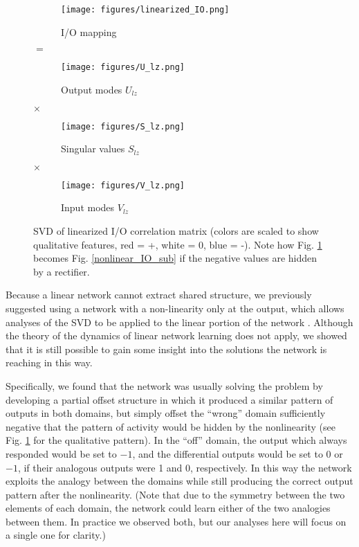 \documentclass[11pt]{article}
\begin{document}
\begin{figure}
\centering
\begin{subfigure}{0.22\textwidth}
\texttt{[image: figures/linearized\_IO.png]}
\caption{I/O mapping}
\label{linearized_IO_sub}
\end{subfigure}
\hspace{-0.25em}\LARGE{$=$}\hspace{-0.25em}
\begin{subfigure}{0.22\textwidth}
\texttt{[image: figures/U\_lz.png]}
\caption{Output modes $U_{lz}$}
\end{subfigure}
\hspace{-0.25em}\LARGE{$\times$}\hspace{-0.25em}
\begin{subfigure}{0.22\textwidth}
\texttt{[image: figures/S\_lz.png]}
\caption{Singular values $S_{lz}$}
\end{subfigure}
\hspace{-0.25em}\LARGE{$\times$}\hspace{-0.25em}
\begin{subfigure}{0.22\textwidth}
\texttt{[image: figures/V\_lz.png]}
\caption{Input modes $V_{lz}$}
\end{subfigure}
\caption{SVD of linearized I/O correlation matrix (colors are scaled to show qualitative features, red = +, white = 0, blue = -). Note how Fig. \ref{linearized_IO_sub} becomes Fig. \ref{nonlinear_IO_sub} if the negative values are hidden by a rectifier.} 
\label{linearized_SVD_figure}
\end{figure}
Because a linear network cannot extract shared structure, we previously suggested using a network with a non-linearity only at the output, which allows analyses of the SVD to be applied to the linear portion of the network \citep{Lampinen2017}. Although the theory of the dynamics of linear network learning does not apply, we showed that it is still possible to gain some insight into the solutions the network is reaching in this way. \par
Specifically, we found that the network was usually solving the problem by developing a partial offset structure in which it produced a similar pattern of outputs in both domains, but simply offset the ``wrong'' domain sufficiently negative that the pattern of activity would be hidden by the nonlinearity (see Fig. \ref{linearized_IO_sub} for the qualitative pattern). In the ``off'' domain, the output which always responded would be set to \(-1\), and the differential outputs would be set to 0 or \(-1\), if their analogous outputs were 1 and 0, respectively. In this way the network exploits the analogy between the domains while still producing the correct output pattern after the nonlinearity. (Note that due to the symmetry between the two elements of each domain, the network could learn either of the two analogies between them. In practice we observed both, but our analyses here will focus on a single one for clarity.) \par
\end{document}
